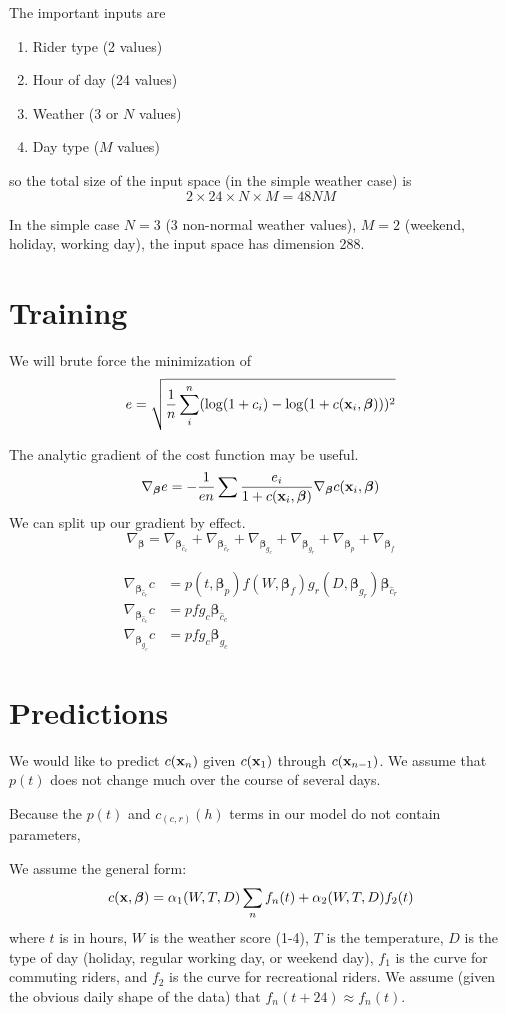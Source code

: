 \documentclass{article}
\newcommand{\bx}{{\bf x}}
\newcommand{\bbeta}{\boldsymbol\beta}
\begin{document}
The important inputs are
\begin{enumerate}
  \item Rider type (2 values)
  \item Hour of day (24 values)
  \item Weather (3 or $N$ values)
  \item Day type ($M$ values)
\end{enumerate}
so the total size of the input space (in the simple weather case) is
\[
2 \times 24 \times N \times M = 48 N M
\]

In the simple case $N=3$ (3 non-normal weather values), $M=2$
(weekend, holiday, working day), the input space has dimension
288.

\section*{Training}

We will brute force the minimization of
\[
e = \sqrt{\frac{1}{n} \sum_i^n (\log (1 + c_i) - \log(1 + c(\bx_i,
\bbeta)))^2}
\]

The analytic gradient of the cost function may be useful.
\[
\nabla_{\bbeta} e = - \frac{1}{e n} \sum \frac{e_i}{1 + c(\bx_i,
\bbeta)} \nabla_{\bbeta} c(\bx_i, \bbeta)
\]
We can split up our gradient by effect.
\[
\nabla_{\bbeta} =
\nabla_{\bbeta_{\hat{c}_c}} +
\nabla_{\bbeta_{\hat{c}_r}} +
\nabla_{\bbeta_{g_c}} +
\nabla_{\bbeta_{g_r}} +
\nabla_{\bbeta_{p}} +
\nabla_{\bbeta_{f}}
\]

\begin{align}
\nabla_{\bbeta_{\hat{c}_r}} c &=
p(t, \bbeta_p) f(W, \bbeta_f) g_r(D, \bbeta_{g_r}) \bbeta_{\hat{c}_r}
\\
\nabla_{\bbeta_{\hat{c}_c}} c &=
p f g_c \bbeta_{\hat{c}_c}
\\
\nabla_{\bbeta_{g_c}} c &=
p f g_c \bbeta_{g_c}
\end{align}

\section*{Predictions}

We would like to predict $c(\bx_n)$ given $c(\bx_1)$ through
$c(\bx_{n-1})$. We assume that $p(t)$ does not change much over the
course of several days.

Because the $p(t)$ and $c_{(c,r)}(h)$ terms in our model do not
contain parameters,


We assume the general form:
\[
c(\bx, \bbeta) = \alpha_1(W, T, D) \sum_n f_n(t) + \alpha_2(W, T, D) f_2(t)
\]
where $t$ is in hours, $W$ is the weather score (1-4), $T$ is the
temperature, $D$ is the type of day (holiday, regular working day, or
weekend day), $f_1$ is the curve for commuting riders, and $f_2$
is the curve for recreational riders. We assume (given the obvious
daily shape of the data) that $f_n(t + 24) \approx f_n(t)$.
\end{document}
